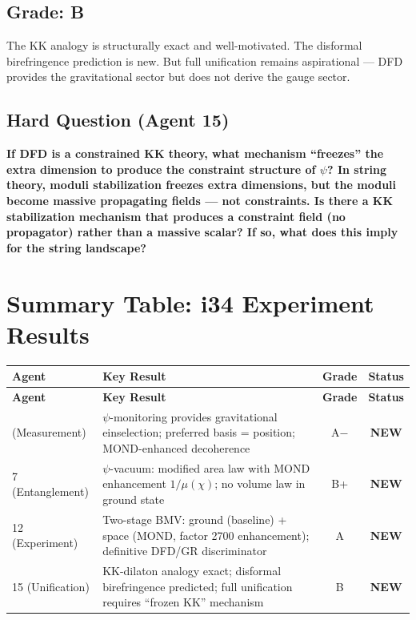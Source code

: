\documentclass[11pt,a4paper]{article}
\newcommand{\NEW}{\textcolor{dfdblue}{\textbf{NEW}}}
\begin{document}
\subsection{Grade: B}

The KK analogy is structurally exact and well-motivated. The disformal birefringence prediction is new. But full unification remains aspirational --- DFD provides the gravitational sector but does not derive the gauge sector.

\subsection{Hard Question (Agent 15)}

\textbf{If DFD is a constrained KK theory, what mechanism ``freezes'' the extra dimension to produce the constraint structure of $\psi$? In string theory, moduli stabilization freezes extra dimensions, but the moduli become massive propagating fields --- not constraints. Is there a KK stabilization mechanism that produces a constraint field (no propagator) rather than a massive scalar? If so, what does this imply for the string landscape?}

\newpage

\section{Summary Table: i34 Experiment Results}
\label{sec:experiment-summary}

\begin{center}
\begin{longtable}{lp{6cm}cc}
\toprule
\textbf{Agent} & \textbf{Key Result} & \textbf{Grade} & \textbf{Status} \\
\midrule
\endfirsthead
\midrule
\textbf{Agent} & \textbf{Key Result} & \textbf{Grade} & \textbf{Status} \\
\midrule
\endhead
\bottomrule
\endlastfoot
6 (Measurement) & $\psi$-monitoring provides gravitational einselection; preferred basis = position; MOND-enhanced decoherence & A$-$ & \NEW \\
7 (Entanglement) & $\psi$-vacuum: modified area law with MOND enhancement $1/\mu(\chi)$; no volume law in ground state & B+ & \NEW \\
12 (Experiment) & Two-stage BMV: ground (baseline) + space (MOND, factor 2700 enhancement); definitive DFD/GR discriminator & A & \NEW \\
15 (Unification) & KK-dilaton analogy exact; disformal birefringence predicted; full unification requires ``frozen KK'' mechanism & B & \NEW \\
\end{longtable}
\end{center}
\end{document}
